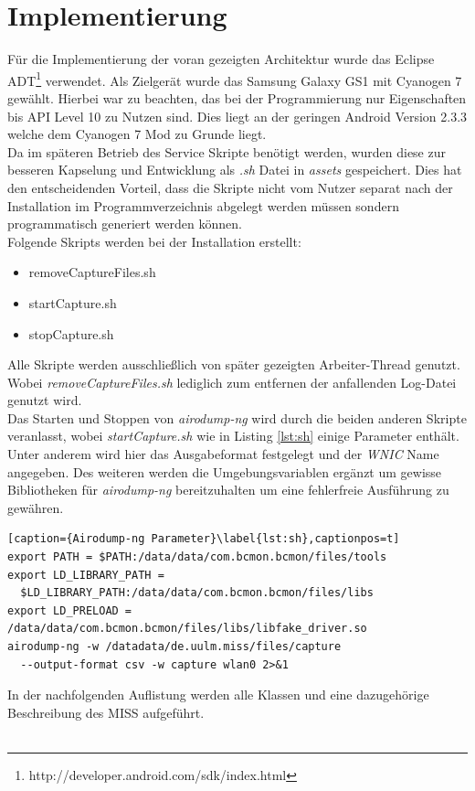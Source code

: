 \documentclass[]{report}
\begin{document}
\section{Implementierung}
Für die Implementierung der voran gezeigten Architektur wurde das Eclipse ADT\footnote{http://developer.android.com/sdk/index.html} verwendet. Als Zielgerät wurde das Samsung Galaxy GS1 mit Cyanogen 7 gewählt. Hierbei war zu beachten, das bei der Programmierung nur Eigenschaften bis API Level 10 zu Nutzen sind. Dies liegt an der geringen Android Version 2.3.3 welche dem Cyanogen 7 Mod zu Grunde liegt. \\
Da im späteren Betrieb des Service Skripte benötigt werden, wurden diese zur besseren Kapselung und Entwicklung als \textit{.sh} Datei in \textit{assets} gespeichert. Dies hat den entscheidenden Vorteil, dass die Skripte nicht vom Nutzer separat nach der Installation im Programmverzeichnis abgelegt werden müssen sondern programmatisch generiert werden können.\\
Folgende Skripts werden bei der Installation erstellt:
\begin{itemize}
\item removeCaptureFiles.sh
\item startCapture.sh
\item stopCapture.sh
\end{itemize}
Alle Skripte werden ausschließlich von später gezeigten Arbeiter-Thread genutzt. Wobei \textit{removeCaptureFiles.sh} lediglich zum entfernen der anfallenden Log-Datei genutzt wird. \\ Das Starten und Stoppen von \textit{airodump-ng} wird durch die beiden anderen Skripte veranlasst, wobei \textit{startCapture.sh} wie in Listing \ref{lst:sh} einige Parameter enthält. Unter anderem wird hier das Ausgabeformat festgelegt und der \textit{WNIC} Name angegeben. Des weiteren werden die Umgebungsvariablen ergänzt um gewisse Bibliotheken für \textit{airodump-ng} bereitzuhalten um eine fehlerfreie Ausführung zu gewähren.
\begin{lstlisting}[caption={Airodump-ng Parameter}\label{lst:sh},captionpos=t] 
export PATH = $PATH:/data/data/com.bcmon.bcmon/files/tools
export LD_LIBRARY_PATH = 
  $LD_LIBRARY_PATH:/data/data/com.bcmon.bcmon/files/libs
export LD_PRELOAD = /data/data/com.bcmon.bcmon/files/libs/libfake_driver.so
airodump-ng -w /datadata/de.uulm.miss/files/capture 
  --output-format csv -w capture wlan0 2>&1
 \end{lstlisting}
In der nachfolgenden Auflistung werden alle Klassen und eine dazugehörige Beschreibung des MISS aufgeführt.\\ \\
\end{document}
